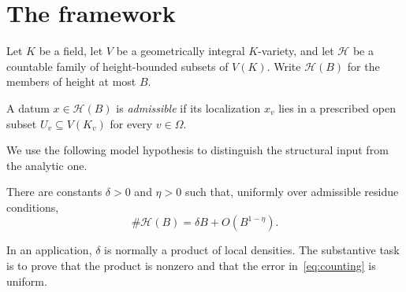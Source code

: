 \section{The framework}\label{sec:framework}

Let $K$ be a field, let $V$ be a geometrically integral $K$-variety, and let
$\mathcal{H}$ be a countable family of height-bounded subsets of $V(K)$. Write
$\mathcal{H}(B)$ for the members of height at most $B$.

\begin{definition}\label{def:admissible}
A datum $x\in\mathcal{H}(B)$ is \emph{admissible} if its localization $x_v$
lies in a prescribed open subset $U_v\subseteq V(K_v)$ for every
$v\in\Omega$.
\end{definition}

We use the following model hypothesis to distinguish the structural input from
the analytic one.

\begin{assumption}\label{ass:equidistribution}
There are constants $\delta>0$ and $\eta>0$ such that, uniformly over
admissible residue conditions,
\begin{equation}\label{eq:counting}
  \#\mathcal{H}(B)=\delta B+O\!\left(B^{1-\eta}\right).
\end{equation}
\end{assumption}

\begin{remark}
In an application, $\delta$ is normally a product of local densities. The
substantive task is to prove that the product is nonzero and that the error
in~\eqref{eq:counting} is uniform.
\end{remark}
